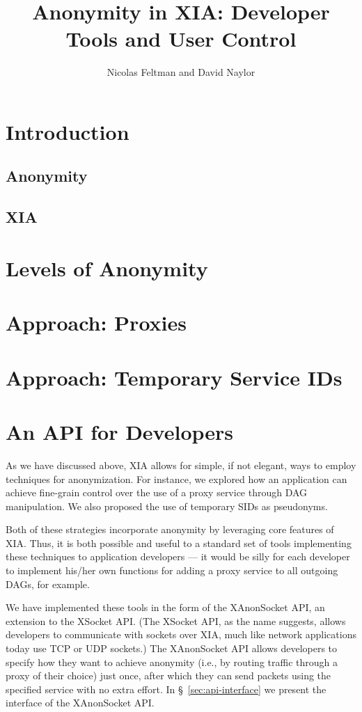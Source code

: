 \documentclass[11pt]{article}
\title{Anonymity in XIA: Developer Tools and User Control}
\author{Nicolas Feltman and David Naylor}
\date{}
\begin{document}
\maketitle

\section{Introduction}
\subsection{Anonymity}
\subsection{XIA}


\section{Levels of Anonymity}


\section{Approach: Proxies}


\section{Approach: Temporary Service IDs}


\section{An API for Developers}
As we have discussed above, XIA allows for simple, if not elegant, ways to employ techniques for anonymization. For instance, we explored how an application can achieve fine-grain control over the use of a proxy service through DAG manipulation. We also proposed the use of temporary SIDs as pseudonyms.

Both of these strategies incorporate anonymity by leveraging core features of XIA. Thus, it is both possible and useful to a standard set of tools implementing these techniques to application developers --- it would be silly for each developer to implement his/her own functions for adding a proxy service to all outgoing DAGs, for example.

We have implemented these tools in the form of the XAnonSocket API, an extension to the XSocket API. (The XSocket API, as the name suggests, allows developers to communicate with sockets over XIA, much like network applications today use TCP or UDP sockets.) The XAnonSocket API allows developers to specify how they want to achieve anonymity (i.e., by routing traffic through a proxy of their choice) just once, after which they can send packets using the specified service with no extra effort. In \S~\ref{sec:api-interface} we present the interface of the XAnonSocket API.
\end{document}
